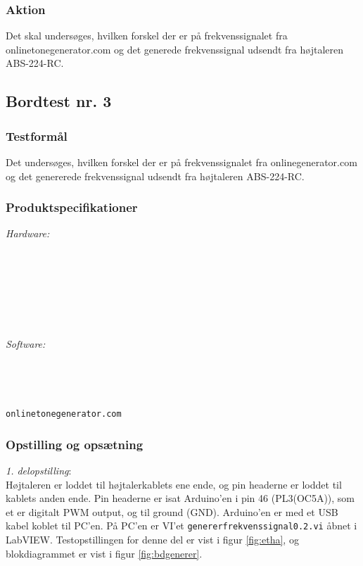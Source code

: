 {			\subsubsection{Aktion}
			Det skal undersøges, hvilken forskel der er på frekvenssignalet fra onlinetonegenerator.com og det generede frekvenssignal udsendt fra højtaleren ABS-224-RC.  
	
		\subsection{Bordtest nr. 3} %
		\subsubsection{Testformål}
		Det undersøges, hvilken forskel der er på frekvenssignalet fra onlinegenerator.com og det genererede frekvenssignal udsendt fra højtaleren ABS-224-RC.  
		
		\subsubsection{Produktspecifikationer}
		
		\textit{Hardware:}\\
		\\
		\\
		\pins\\
		\krympeflex
		\arduino\\
		\usbkabel\\
		\PC\\
		\mikrofon\\
	
		\textit{Software:}\\
		\labview\\
		\visa\\
		\vi\\
		\ardsw\\
		\texttt{onlinetonegenerator.com}
		
		\subsubsection{Opstilling og opsætning}
		\textit{1. delopstilling}:\\
		Højtaleren er loddet til højtalerkablets ene ende, og pin headerne er loddet til kablets anden ende. 
		Pin headerne er isat Arduino'en i pin 46 (PL3(OC5A)), som et er digitalt PWM output, og til ground (GND). 
		Arduino'en er med et USB kabel koblet til PC'en. 		
		På PC'en er VI'et \texttt{genererfrekvenssignal0.2.vi} åbnet i LabVIEW. Testopstillingen for denne del er vist i figur \ref{fig:etha}, og blokdiagrammet er vist i figur \ref{fig:bdgenerer}.\\ 
 
}

